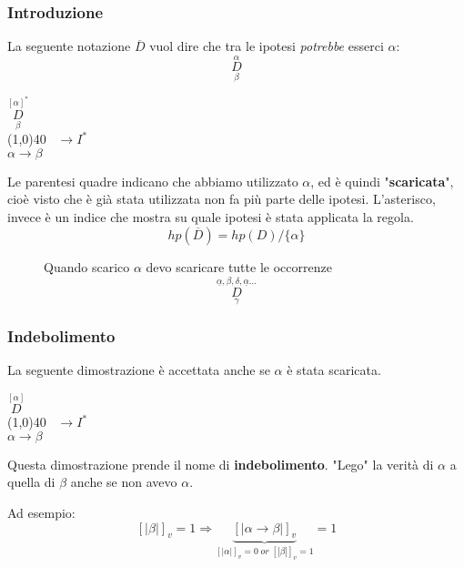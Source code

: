 \documentclass{article}
\theoremstyle{break}
\theoremstyle{break}
\theoremstyle{break}
\theoremstyle{break}
\begin{document}
\subsubsection{Introduzione}
 
La seguente notazione \( \overline{D} \) vuol dire che tra le ipotesi \emph{potrebbe} esserci \( \alpha \):
\[
    \underset{\beta}{\stackrel{\alpha}{D}}
\] 
\begin{center}
    \(
    \underset{\beta}{\stackrel{[\alpha]^*}{D}}
    \)\\ 
    \hspace{1cm}\line(1,0){40}\(\;\;\; \to I^* \)\\
    \(
        \alpha \to \beta
    \) 
\end{center}
Le parentesi quadre indicano che abbiamo utilizzato \( \alpha \), ed è quindi "\textbf{scaricata}",
cioè visto che è già stata utilizzata non fa più parte delle ipotesi. L'asterisco, invece è un indice
che mostra su quale ipotesi è stata applicata la regola.
\[
    hp(\overline{D})=hp(D) / \{\alpha\} 
\] 

\begin{figure}[H]
    \begin{example}
        Quando scarico \( \alpha \) devo scaricare tutte le occorrenze 
        \[
            \stackrel{\underline{\alpha},\beta,\delta,\underline{\alpha} \ldots}{\underset{\gamma}{D}}
        \] 
    \end{example}
\end{figure}

\subsubsection{Indebolimento}
        La seguente dimostrazione è accettata anche se \( \alpha \) è stata scaricata.
        \begin{center}
            \(\stackrel{[\alpha]}{D}\)\\
            \hspace{1cm}\line(1,0){40}\(\;\;\; \to I^* \)\\
            \( \alpha \to \beta \) 
        \end{center}
        Questa dimostrazione prende il nome di \textbf{indebolimento}. "Lego" la verità di \( \alpha \) 
        a quella di \( \beta \) anche se non avevo \( \alpha \).

        Ad esempio:
        \[
            [|\beta|]_v=1 \Rightarrow \underbrace{[|\alpha \to \beta|]_v}_{[|\alpha|]_v=0\;or\;[|\beta|]_v=1}=1
        \] 
\end{document}
